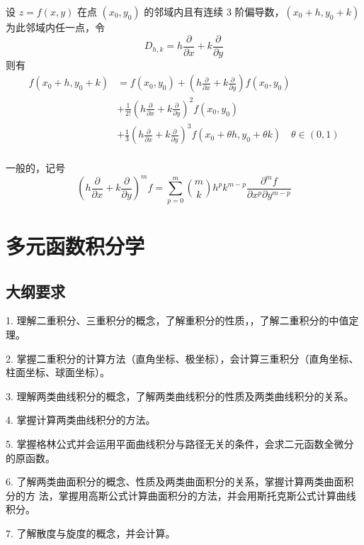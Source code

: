 \begin{theorem}
	设 $z = f(x, y)$ 在点 $(x_0, y_0)$ 的邻域内且有连续 $3$ 阶偏导数，$(x_0 + h, y_0 + k)$ 为此邻域内任一点，令
	\[ D_{h,k} = h \frac{\partial}{\partial x} + k \frac{\partial}{\partial y} \]
	则有
	\[
		\begin{aligned}
			f(x_0 + h, y_0 + k) & = f(x_0, y_0) + \left(h \frac{\partial}{\partial x} + k \frac{\partial}{\partial y}\right) f(x_0, y_0)                                               \\
			                    & + \frac{1}{2!} \left(h \frac{\partial}{\partial x} + k \frac{\partial}{\partial y}\right)^2 f(x_0, y_0)                                              \\
			                    & + \frac{1}{3} \left(h \frac{\partial}{\partial x} + k \frac{\partial}{\partial y}\right)^3 f(x_0 + \theta h, y_0 + \theta k) \quad \theta \in (0, 1) \\
		\end{aligned}
	\]
\end{theorem}

一般的，记号
\[ \left(h \frac{\partial}{\partial x} + k \frac{\partial}{\partial y}\right)^m f = \sum_{p=0}^{m} \binom{m}{k} h^p k^{m-p} \frac{\partial^m f}{\partial x^p \partial y^{m-p}} \]

\section{多元函数积分学}

\subsection{大纲要求}

1. 理解二重积分、三重积分的概念，了解重积分的性质，，了解二重积分的中值定理。

2. 掌握二重积分的计算方法（直角坐标、极坐标），会计算三重积分（直角坐标、柱面坐标、球面坐标）。

3. 理解两类曲线积分的概念，了解两类曲线积分的性质及两类曲线积分的关系。

4. 掌握计算两类曲线积分的方法。

5. 掌握格林公式并会运用平面曲线积分与路径无关的条件，会求二元函数全微分的原函数。

6. 了解两类曲面积分的概念、性质及两类曲面积分的关系，掌握计算两类曲面积分的方
法，掌握用高斯公式计算曲面积分的方法，并会用斯托克斯公式计算曲线积分。

7. 了解散度与旋度的概念，并会计算。

